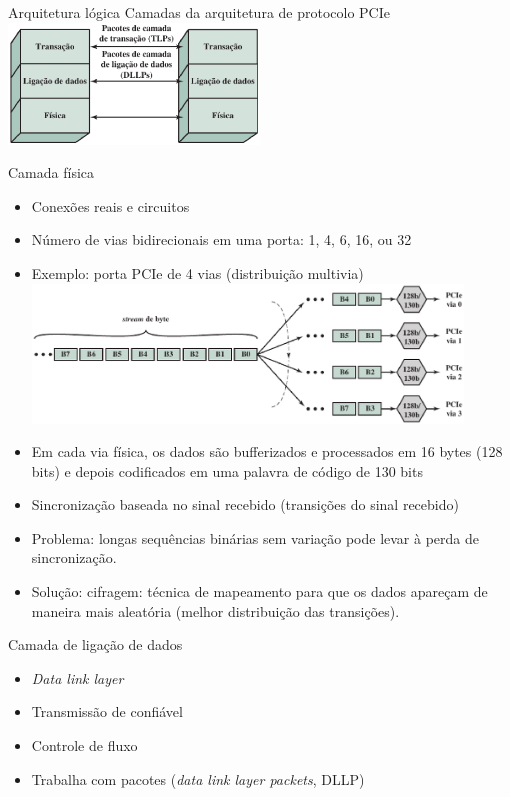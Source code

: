 \begin{slide}{Arquitetura lógica}
Camadas da arquitetura de protocolo PCIe\\
   \centering
   \includegraphics[width=0.5\textwidth]{figs/3-22}
\end{slide}

\begin{slide}{Camada física}
	\begin{itemize}
		\item Conexões reais e circuitos
		\item Número de vias bidirecionais em uma porta: 1, 4, 6, 16, ou 32
		\item Exemplo: porta PCIe de 4 vias (distribuição multivia)
			\centering
			\includegraphics[width=0.9\textwidth]{figs/3-23}
		\item Em cada via física, os dados são bufferizados e processados em 16 bytes (128 bits) e depois codificados em uma palavra de código de 130 bits
		\item Sincronização baseada no sinal recebido (transições do sinal recebido)
		\item Problema: longas sequências binárias sem variação pode levar à perda de sincronização.
		\item Solução: cifragem:  técnica de mapeamento para que os dados apareçam de maneira mais aleatória (melhor distribuição das transições).
	\end{itemize}
\end{slide}

\begin{slide}{Camada de ligação de dados}
	\begin{itemize}
		\item \textit{Data link layer}
		\item Transmissão de confiável
		\item Controle de fluxo
		\item Trabalha com pacotes (\textit{data link layer packets}, DLLP)
	\end{itemize}
\end{slide}

